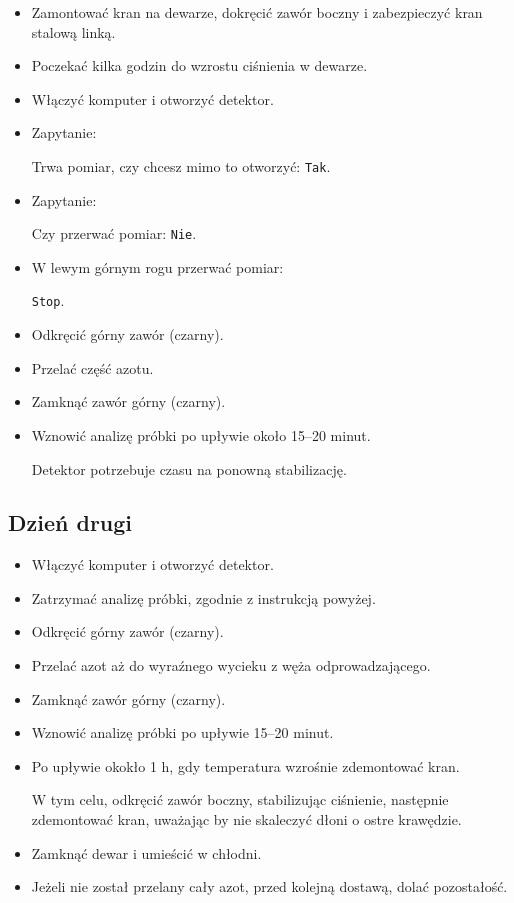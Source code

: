 \documentclass[
  letterpaper,
  DIV=11,
  numbers=noendperiod]{scrreprt}
\begin{document}
\begin{itemize}
\item
  Zamontować kran na dewarze, dokręcić zawór boczny i zabezpieczyć kran
  stalową linką.
\item
  Poczekać kilka godzin do wzrostu ciśnienia w dewarze.
\item
  Włączyć komputer i otworzyć detektor.
\item
  Zapytanie:

  Trwa pomiar, czy chcesz mimo to otworzyć: \texttt{Tak}.
\item
  Zapytanie:

  Czy przerwać pomiar: \texttt{Nie}.
\item
  W lewym górnym rogu przerwać pomiar:

  \texttt{Stop}.
\item
  Odkręcić górny zawór (czarny).
\item
  Przelać część azotu.
\item
  Zamknąć zawór górny (czarny).
\item
  Wznowić analizę próbki po upływie około 15--20 minut.

  Detektor potrzebuje czasu na ponowną stabilizację.
\end{itemize}

\hypertarget{dzieux144-drugi}{%
\subsection{Dzień drugi}\label{dzieux144-drugi}}

\begin{itemize}
\item
  Włączyć komputer i otworzyć detektor.
\item
  Zatrzymać analizę próbki, zgodnie z instrukcją powyżej.
\item
  Odkręcić górny zawór (czarny).
\item
  Przelać azot aż do wyraźnego wycieku z węża odprowadzającego.
\item
  Zamknąć zawór górny (czarny).
\item
  Wznowić analizę próbki po upływie 15--20 minut.
\item
  Po upływie okokło 1 h, gdy temperatura wzrośnie zdemontować kran.

  W tym celu, odkręcić zawór boczny, stabilizując ciśnienie, następnie
  zdemontować kran, uważając by nie skaleczyć dłoni o ostre krawędzie.
\item
  Zamknąć dewar i umieścić w chłodni.
\item
  Jeżeli nie został przelany cały azot, przed kolejną dostawą, dolać
  pozostałość.
\end{itemize}
\end{document}
